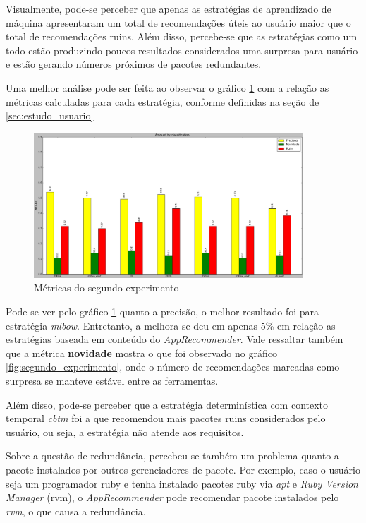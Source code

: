 Visualmente, pode-se perceber que apenas as estratégias de aprendizado de
máquina apresentaram um total de recomendações úteis ao usuário maior que o
total de recomendações ruins. Além disso, percebe-se que as estratégias como um
todo estão produzindo poucos resultados considerados uma surpresa para usuário e
estão gerando números próximos de pacotes redundantes.

Uma melhor análise pode ser feita ao observar o gráfico
\ref{fig:metricas_segundo_experimento} com a relação as métricas calculadas para cada
estratégia, conforme definidas na seção de \ref{sec:estudo_usuario}

\begin{figure}[h]
  \centering
  \includegraphics[width=0.9\textwidth]{figuras/metricas_segundo_experimento.eps}
  \caption{Métricas do segundo experimento}
  \label{fig:metricas_segundo_experimento}
\end{figure}

Pode-se ver pelo gráfico \ref{fig:metricas_segundo_experimento} quanto a
precisão, o melhor resultado foi para estratégia \textit{mlbow}. Entretanto, a
melhora se deu em apenas 5\% em relação as estratégias baseada em conteúdo do
\textit{AppRecommender}. Vale ressaltar também que a métrica \textbf{novidade}
mostra o que foi observado no gráfico \ref{fig:segundo_experimento}, onde o
número de recomendações marcadas como surpresa se manteve estável entre as
ferramentas.

Além disso, pode-se perceber que a estratégia determinística com contexto
temporal \textit{cbtm} foi a que recomendou mais pacotes ruins considerados pelo
usuário, ou seja, a estratégia não atende aos requisitos.

Sobre a questão de redundância, percebeu-se também um problema quanto a pacote
instalados por outros gerenciadores de pacote. Por exemplo, caso o usuário seja
um programador ruby e tenha instalado pacotes ruby via \textit{apt} e
\textit{Ruby Version Manager} (rvm), o \textit{AppRecommender} pode recomendar
pacote instalados pelo \textit{rvm}, o que causa a redundância.

